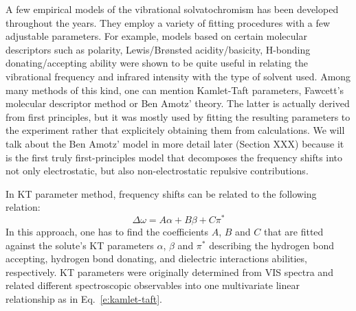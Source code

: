 \documentclass[a4paper,titlepage,twoside,fleqn,12pt]{book}
\begin{document}
\begin{refsection}
A few empirical models of the vibrational solvatochromism has been developed throughout the years.
They employ a variety of fitting procedures with a few adjustable parameters. For example, 
models based on certain molecular descriptors such as polarity, Lewis/Br{\o}nsted acidity/basicity, 
H-bonding donating/accepting ability were shown to be quite useful in relating the vibrational
frequency and infrared intensity with the type of solvent used. Among many methods of this kind,
one can mention Kamlet-Taft parameters\citep{Kamlet.Taft.JACS.1976,Taft.Kamlet.JACS.1976,Kamlet.Abboud.Taft.JACS.1977}, 
Fawcett's molecular descriptor method\citep{Reimers.Hall.JACS.1999,
Fawcett.Liu.Kessler.JPC.1993,Fawcett.Kloss.JCP.1996} or Ben Amotz' theory.\citep{Ben-Amotz.Lee.Cho.List.JCP.1992} 
The latter is actually derived from first principles, but it was mostly used by fitting
the resulting parameters to the experiment rather that explicitely obtaining them from calculations.
We will talk about the Ben Amotz' model in more detail later (Section XXX) because it is the first
truly first-principles model that decomposes the frequency shifts into not only electrostatic, 
but also non-electrostatic repulsive contributions.

In KT parameter method, frequency shifts can be related to the following
relation\citep{Zhang.Markiewicz.Doerksen.Smith.Gai.PCCP.2015}:
%
\begin{equation} \label{e:kamlet-taft}
\Delta \omega = A\alpha + B\beta + C\pi^{*}
\end{equation}
%
In this approach, one has to
find the coefficients $A$, $B$ and $C$ that are fitted against
the solute's KT parameters $\alpha$\citep{Taft.Kamlet.JACS.1976}, 
$\beta$\citep{Kamlet.Taft.JACS.1976} and $\pi^{*}$\citep{Kamlet.Abboud.Taft.JACS.1977} 
describing the hydrogen bond accepting,
hydrogen bond donating, and dielectric interactions abilities, respectively.
KT parameters were originally determined from VIS spectra and related different
spectroscopic observables into one multivariate linear relationship as in Eq.~\eqref{e:kamlet-taft}.


\end{refsection}
\end{document}
